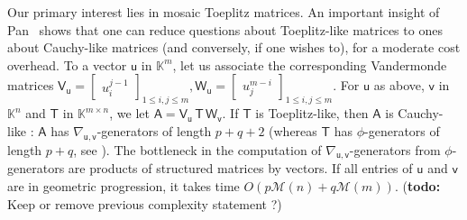 \documentclass[sigconf]{acmart}
\newcommand{\ve}{\ensuremath{\mathsf{e}}}
\newcommand{\vg}{\ensuremath{\mathsf{g}}}
\newcommand{\vh}{\ensuremath{\mathsf{h}}}
\newcommand{\vu}{\ensuremath{\mathsf{u}}}
\newcommand{\vv}{\ensuremath{\mathsf{v}}}
\newcommand{\mA}{\ensuremath{\mathsf{A}}}
\newcommand{\mG}{\ensuremath{\mathsf{G}}}
\newcommand{\mH}{\ensuremath{\mathsf{H}}}
\newcommand{\mT}{\ensuremath{\mathsf{T}}}
\newcommand{\mV}{\ensuremath{\mathsf{V}}}
\newcommand{\mW}{\ensuremath{\mathsf{W}}}
\newcommand{\K}{\ensuremath{\mathbb{K}}}
\newcommand{\M}{\ensuremath{\mathscr{M}}}
\newcommand{\todo}[1]{(\textbf{todo:} #1)}
\theoremstyle{acmdefinition}
\begin{document}
\smallskip{}
Our primary interest lies in mosaic
Toep\-litz matrices. An important insight of Pan~\cite{Pan90} shows
that one can reduce questions about Toeplitz-like matrices to ones
about Cauchy-like matrices (and conversely, if one wishes to), for a
moderate cost overhead. 
%
To a vector $\vu$ in $\K^m$, let us  associate the
corresponding Vandermonde matrices
$
\mV_\vu = \left[\begin{smallmatrix}
u_i^{j-1}
\end{smallmatrix}\right]_{1 \leq i,j \leq m},
\mW_\vu = \left[\begin{smallmatrix}
u_j^{m-i}
\end{smallmatrix}\right]_{1 \leq i,j \leq m}.
$
%
For $\vu$ as above, $\vv$ in $\K^n$ and $\mT$ in $\K^{m\times n}$, we
let $\mA = \mV_\vu\, \mT\, \mW_\vv$. If $\mT$ is Toeplitz-like, then
$\mA$ is Cauchy-like : $\mA$ has $\nabla_{\vu,\vv}$-generators of
length $p+q+2$ (whereas $\mT$ has $\phi$-generators of length $p+q$,
see \cite[Chapter~4.8]{Pan01}). The bottleneck in the computation of
$\nabla_{\vu,\vv}$-generators from $\phi$-generators are products of
structured matrices by vectors.  If all entries of $\vu$ and $\vv$ are
in geometric progression, it takes time $O(p \M(n) + q \M(m))$.
\todo{Keep or remove previous complexity statement ?}


\end{document}
